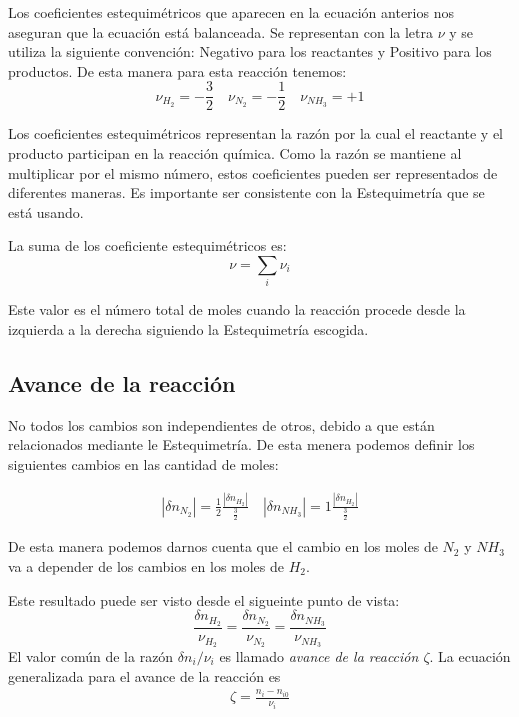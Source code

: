 Los coeficientes estequimétricos que aparecen en la ecuación anterios nos aseguran que la ecuación está balanceada.
Se representan con la letra $\nu$ y se utiliza la siguiente convención: Negativo para los reactantes y Positivo para los productos. De esta manera para esta reacción tenemos:
\begin{equation}
    \nu_{H_2}=-\frac{3}{2}\quad\nu_{N_2}=-\frac{1}{2}\quad\nu_{NH_3}=+1
\end{equation}

Los coeficientes estequimétricos representan la razón por la cual el reactante y el producto participan en la reacción química. Como la razón se mantiene al multiplicar por el mismo número, estos coeficientes pueden ser representados de diferentes maneras. Es importante ser consistente con la Estequimetría que se está usando.

La suma de los coeficiente estequimétricos es:
\begin{equation}
    \nu = \sum_i \nu_i
\end{equation}

Este valor es el número total de moles cuando la reacción procede desde la izquierda a la derecha siguiendo la Estequimetría escogida. 
\subsection{Avance de la reacción}
No todos los cambios son independientes de otros, debido a que están relacionados mediante le Estequimetría. De esta menera podemos definir los siguientes cambios en las 
cantidad de moles:

\begin{align}
    |\delta n_{N_2}|=\frac{1}{2}\frac{|\delta n_{H_2}|}{\frac{3}{2}} \quad |\delta n_{NH_3}|=1\frac{|\delta n_{H_2}|}{\frac{3}{2}}
\end{align}

De esta manera podemos darnos cuenta que el cambio en los moles de $N_2$ y $NH_3$ va a depender de los cambios en los moles de $H_2$.

Este resultado puede ser visto desde el sigueinte punto de vista:
\begin{equation}
    \frac{\delta n_{H_2}}{\nu_{H_2}}= \frac{\delta n_{N_2}}{\nu_{N_2}}= \frac{\delta n_{NH_3}}{\nu_{NH_3}}
\end{equation}
El valor común de la razón $\delta n_i/\nu_i$ es llamado \textit{avance de la reacción $\zeta$}. La ecuación generalizada para el avance de la reacción es
\begin{align}
    \zeta=\frac{n_i-n_{i0}}{\nu_i}
\end{align}


